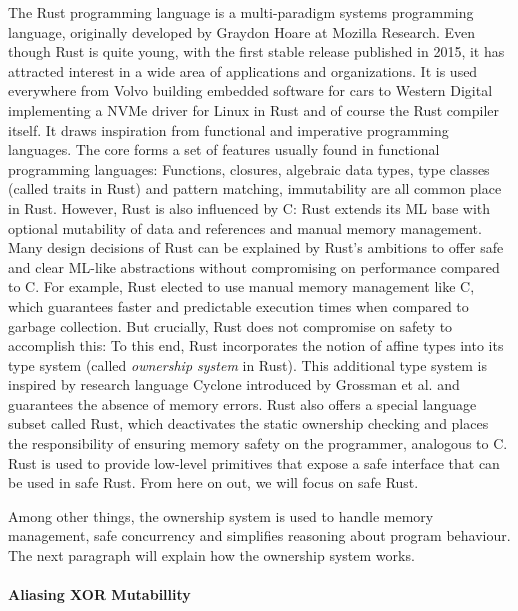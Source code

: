 \documentclass[twoside, english, final]{sdqthesis}
\theoremstyle{definition}
\begin{document}
The Rust programming language \cite{matsakis_rust_2014} is a multi-paradigm systems programming language, originally developed by Graydon Hoare at Mozilla Research.
Even though Rust is quite young, with the first stable release published in 2015, it has attracted interest in a wide area of applications and organizations. It is used everywhere from Volvo building embedded software for cars \cite{foufas_why_2022} to Western Digital implementing a NVMe driver for Linux in Rust \cite{larabel_lpc_2022} and of course the Rust compiler itself.
It draws inspiration from functional and imperative programming languages. The core forms a set of features usually found in functional programming languages: Functions, closures, algebraic data types, type classes (called traits in Rust) and pattern matching, immutability are all common place in Rust.
However, Rust is also influenced by C: Rust extends its ML base with optional mutability of data and references and manual memory management. Many design decisions of Rust can be explained by Rust's ambitions to offer safe and clear ML-like abstractions without compromising on performance compared to C.
For example, Rust elected to use manual memory management like C, which guarantees faster and predictable execution times when compared to garbage collection. But crucially, Rust does not compromise on safety to accomplish this: To this end, Rust incorporates the notion of affine types into its type system (called \textit{ownership system} in Rust). This additional type system is inspired by research language Cyclone introduced by Grossman et al. \cite{grossman_region-based_nodate} and guarantees the absence of memory errors.
Rust also offers a special language subset called  Rust, which deactivates the static ownership checking and places the responsibility of ensuring memory safety on the programmer, analogous to C.  Rust is used to provide low-level primitives that expose a safe interface that can be used in safe Rust. From here on out, we will focus on safe Rust.

Among other things, the ownership system is used to handle memory management, safe concurrency and simplifies reasoning about program behaviour.
The next paragraph will explain how the ownership system works.

\paragraph{Aliasing XOR Mutabillity}
\end{document}
